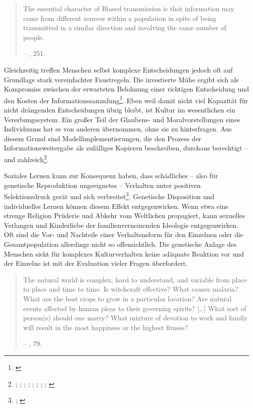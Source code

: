 \documentclass[openany,twoside,twocolumn]{book}
\let\rmarkdownfootnote\footnote%
\def\footnote{\protect\rmarkdownfootnote}
\begin{document}
\begin{quote}
The essential character of Biased transmission is that information may
come from different sources within a population in spite of being
transmitted in a similar direction and involving the same number of
people.

-- \textcite{eerkens_cultural_2007}, 251.
\end{quote}

Gleichzeitig treffen Menschen selbst komplexe Entscheidungen jedoch oft
auf Grundlage stark vereinfachter Faustregeln. Die investierte Mühe
ergibt sich als Kompromiss zwischen der erwarteten Belohnung einer
richtigen Entscheidung und den Kosten der Informationssammlung\footnote{\textcite{nisbett_human_1980}}.
Eben weil damit nicht viel Kapazität für nicht drängenden Entscheidungen
übrig bleibt, ist Kultur im wesentlichen ein Vererbungssystem. Ein
großer Teil der Glaubens- und Moralvorstellungen eines Individuums hat
es von anderen übernommen, ohne sie zu hinterfragen. Aus diesem Grund
sind Modellimplementierungen, die den Prozess der Informationsweitergabe
als zufälliges Kopieren beschreiben, durchaus berechtigt -- und
zahlreich\footnote{\textcite{bentley_academic_2006};
  \textcite{bentley_cultural_2003}; \textcite{bentley_random_2004-1};
  \textcite{hahn_drift_2003}; \textcite{herzog_random_2004};
  \textcite{lipo_science_2001}; \textcite{lipo_population_1997};
  \textcite{neiman_stylistic_1995}; \textcite{shennan_ceramic_2001}}.

Soziales Lernen kann zur Konsequenz haben, dass schädliches -- also für
genetische Reproduktion ungeeignetes -- Verhalten unter positiven
Selektionsdruck gerät und sich verbreitet\footnote{\textcite{eerkens_cultural_2007};
  \textcite{enquist_evolution_2007}}. Genetische Disposition und
individuelles Lernen können diesem Effekt entgegenwirken. Wenn etwa eine
strenge Religion Prüderie und Abkehr vom Weltlichen propagiert, kann
sexuelles Verlangen und Kinderliebe der familienverneinenden Ideologie
entgegenwirken. Oft sind die Vor- und Nachteile einer Verhaltensform für
den Einzelnen oder die Gesamtpopulation allerdings nicht so
offensichtlich. Die genetische Anlage des Menschen sieht für komplexes
Kulturverhalten keine adäquate Reaktion vor und der Einzelne ist mit der
Evaluation vieler Fragen überfordert.

\begin{quote}
The natural world is complex, hard to understand, and variable from
place to place and time to time. Is witchcraft effective? What causes
malaria? What are the best crops to grow in a particular location? Are
natural events affected by human pleas to their governing spirits?
{[}\ldots{}{]} What sort of person(s) should one marry? What mixture of
devotion to work and family will result in the most happiness or the
highest fitness?

-- \textcite{smith_cultural_1992}, 79.
\end{quote}
\end{document}
